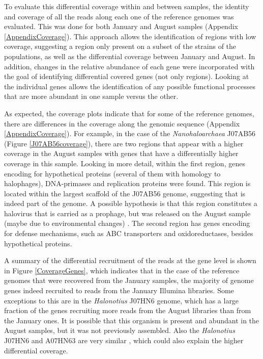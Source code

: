 To evaluate this differential coverage within and between samples, the identity and coverage of all the reads along each one of the reference genomes was evaluated. This was done for both January and August samples (Appendix \ref{AppendixCoverage}). This approach allows the identification of regions with low coverage, suggesting a region only present on a subset of the strains of the populations, as well as the differential coverage between January and August. In addition, changes in the relative abundance of each gene were incorporated with the goal of identifying differential covered genes (not only regions). Looking at the individual genes allows the identification of any possible functional processes that are more abundant in one sample versus the other.

As expected, the coverage plots indicate that for some of the reference genomes, there are differences in the coverage along the genomic sequence (Appendix \ref{AppendixCoverage}). For example, in the case of the \textit{Nanohaloarchaea} J07AB56 (Figure \ref{J07AB56coverage}), there are two regions that appear with a higher coverage in the August samples with genes that have a differentially higher coverage in this sample. Looking in more detail, within the first region, genes encoding for hypothetical proteins (several of them with homology to halophages), DNA-primases and replication proteins were found. This region is located within the largest scaffold of the J07AB56 genome, suggesting that is indeed part of the genome. A possible hypothesis is that this region constitutes a halovirus that is carried as a prophage, but was released on the August sample (maybe due to environmental changes) \cite{Porter:2007jw}. The second region has genes encoding for defense mechanisms, such as ABC transporters and oxidoreductases, besides hypothetical proteins.

A summary of the differential recruitment of the reads at the gene level is shown in Figure \ref{CoverageGenes}, which indicates that in the case of the reference genomes that were recovered from the January samples, the majority of genome genes indeed recruited to reads from the January Illumina libraries. Some exceptions to this are in the \textit{Halonotius} J07HN6 genome, which has a large fraction of the genes recruiting more reads from the August libraries than from the January ones. It is possible that this organism is present and abundant in the August samples, but it was not previously assembled. Also the \textit{Halonotius} J07HN6 and A07HN63 are very similar \cite{Podell:2013fp}, which could also explain the higher differential coverage.

